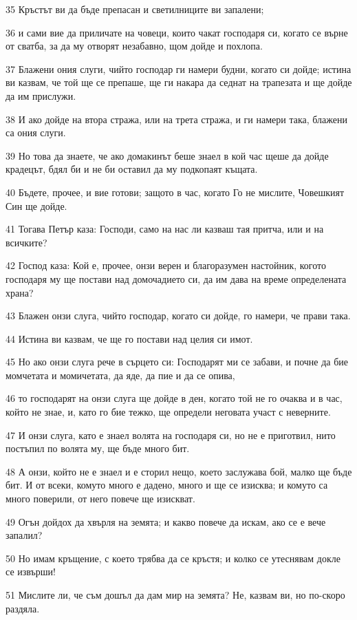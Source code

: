 \par 35 Кръстът ви да бъде препасан и светилниците ви запалени;
\par 36 и сами вие да приличате на човеци, които чакат господаря си, когато се върне от сватба, за да му отворят незабавно, щом дойде и похлопа.
\par 37 Блажени ония слуги, чийто господар ги намери будни, когато си дойде; истина ви казвам, че той ще се препаше, ще ги накара да седнат на трапезата и ще дойде да им прислужи.
\par 38 И ако дойде на втора стража, или на трета стража, и ги намери така, блажени са ония слуги.
\par 39 Но това да знаете, че ако домакинът беше знаел в кой час щеше да дойде крадецът, бдял би и не би оставил да му подкопаят къщата.
\par 40 Бъдете, прочее, и вие готови; защото в час, когато Го не мислите, Човешкият Син ще дойде.
\par 41 Тогава Петър каза: Господи, само на нас ли казваш тая притча, или и на всичките?
\par 42 Господ каза: Кой е, прочее, онзи верен и благоразумен настойник, когото господаря му ще постави над домочадието си, да им дава на време определената храна?
\par 43 Блажен онзи слуга, чийто господар, когато си дойде, го намери, че прави така.
\par 44 Истина ви казвам, че ще го постави над целия си имот.
\par 45 Но ако онзи слуга рече в сърцето си: Господарят ми се забави, и почне да бие момчетата и момичетата, да яде, да пие и да се опива,
\par 46 то господарят на онзи слуга ще дойде в ден, когато той не го очаква и в час, който не знае, и, като го бие тежко, ще определи неговата участ с неверните.
\par 47 И онзи слуга, като е знаел волята на господаря си, но не е приготвил, нито постъпил по волята му, ще бъде много бит.
\par 48 А онзи, който не е знаел и е сторил нещо, което заслужава бой, малко ще бъде бит. И от всеки, комуто много е дадено, много и ще се изисква; и комуто са много поверили, от него повече ще изискват.
\par 49 Огън дойдох да хвърля на земята; и какво повече да искам, ако се е вече запалил?
\par 50 Но имам кръщение, с което трябва да се кръстя; и колко се утеснявам докле се извърши!
\par 51 Мислите ли, че съм дошъл да дам мир на земята? Не, казвам ви, но по-скоро раздяла.

